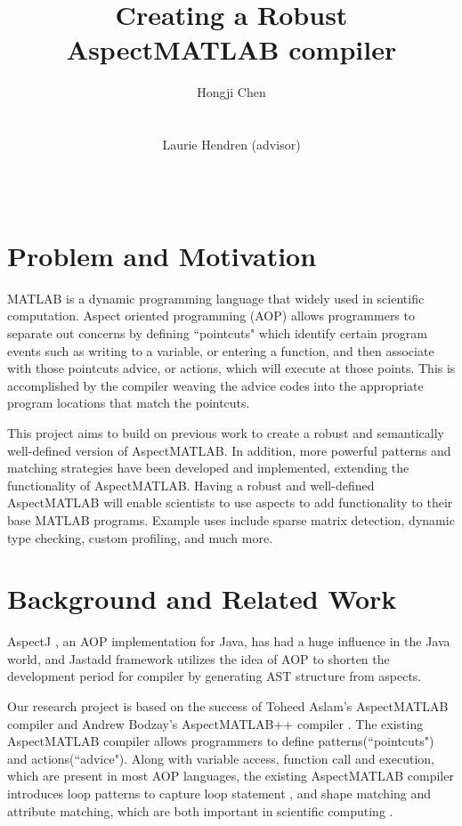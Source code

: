 \documentclass[preprint]{sig-alternate-05-2015}
\title{Creating a Robust AspectMATLAB compiler}
\author{
\alignauthor
Hongji Chen\\
			\affaddr{McGill University}			\\
			\affaddr{Montreal, QC, Canada}		\\
			\email{hongji.chen@mail.mcgill.ca}
\alignauthor
Laurie Hendren (advisor)\\
			\affaddr{McGill University}			\\
			\affaddr{Montreal, QC, Canada}		\\
			\email{hendren@cs.mcgill.ca}
}
\begin{document}
\maketitle

\section{Problem and Motivation}

MATLAB \cite{MATLABWeb} is a dynamic programming language that widely
used in scientific computation.  Aspect oriented programming (AOP) allows
programmers to separate out concerns by defining ``pointcuts" which identify
certain program events such as writing to a variable,  or entering a function,
and then associate with those pointcuts advice, or actions, which will
execute at those points.  This is accomplished by the compiler weaving
the advice codes into the appropriate program locations that match the
pointcuts.

This project aims to build on previous work to create a robust and
semantically well-defined version of AspectMATLAB.  In addition, more
powerful patterns and matching strategies have been developed and
implemented,  extending the functionality of AspectMATLAB.  Having a
robust and well-defined AspectMATLAB will enable scientists to use
aspects to add functionality to their base MATLAB programs. Example uses
include sparse matrix detection, dynamic type checking, custom profiling, and
much more.


\section{Background and Related Work}

AspectJ \cite{AspectJ}, an AOP implementation for Java, has had a huge
influence in the Java world, and Jastadd \cite{JastAdd} framework
utilizes the idea of AOP to shorten the development period for compiler by
generating AST structure from aspects. 

Our research project is based on the success of Toheed Aslam's
AspectMATLAB compiler \cite{AspectMATLABpaper} and Andrew Bodzay's
AspectMATLAB++ compiler \cite{AspectMATLABPPpaper}. The existing
AspectMATLAB compiler allows programmers to define patterns(``pointcuts")
and actions(``advice"). Along with variable access, function call and
execution, which are present in most AOP languages, the existing
AspectMATLAB compiler introduces loop patterns to capture loop statement
\cite[p.15-17]{ToheedMasterThesis}, and shape matching and attribute matching,
which are both important in scientific computing
\cite[p.14-15]{AndrewMasterThesis}.
\end{document}
